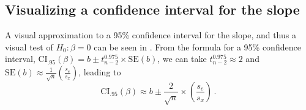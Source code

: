 \subsection{Visualizing a confidence interval for the slope}

A visual approximation to a 95\% confidence interval for the slope, and thus a visual test of $H_0 : \beta = 0$
can be seen in .  From the formula for a 95\% confidence interval,
$\mathrm{CI}_{.95} (\beta) = b \pm t_{n-2}^{0.975} \times \mathrm{SE}(b)$, we can take $t_{n-2}^{0.975} \approx 2$
and
$\mathrm{SE}(b) \approx \frac{1}{\sqrt{n}}\left( \frac{s_e}{s_x} \right)$,
leading to
\begin{equation}\label{eq:ci-approx}
\mathrm{CI}_{.95} (\beta) \approx b \pm \frac{2}{\sqrt{n}} \times \left( \frac{s_e}{s_x} \right) \period
\end{equation}
